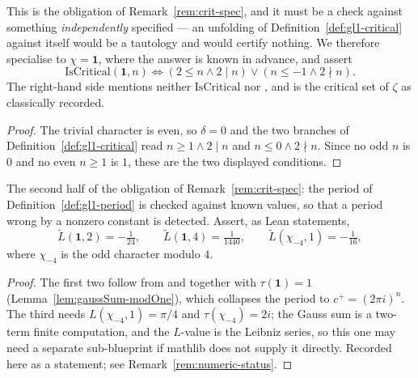 \begin{lemma}
  \label{lem:gl1-crit-spec}
  \leanok
  This is the obligation of Remark~\ref{rem:crit-spec}, and it must be a check against
  something \emph{independently} specified --- an unfolding of
  Definition~\ref{def:gl1-critical} against itself would be a tautology and would
  certify nothing. We therefore specialise to $\chi = \mathbf{1}$, where the answer is
  known in advance, and assert
  \[ \mathrm{IsCritical}(\mathbf{1}, n) \iff (2 \leq n \wedge 2 \mid n) \vee (n \leq -1 \wedge 2 \nmid n). \]
  The right-hand side mentions neither $\mathrm{IsCritical}$ nor
  , and is the critical set of $\zeta$ as classically recorded.
\end{lemma}
\begin{proof}
  \leanok
  The trivial character is even, so $\delta = 0$ and the two branches of
  Definition~\ref{def:gl1-critical} read $n \geq 1 \wedge 2 \mid n$ and
  $n \leq 0 \wedge 2 \nmid n$. Since no odd $n$ is $0$ and no even $n \geq 1$ is $1$,
  these are the two displayed conditions.
\end{proof}

\begin{lemma}
  \label{lem:gl1-numeric}
  The second half of the obligation of Remark~\ref{rem:crit-spec}: the period of
  Definition~\ref{def:gl1-period} is checked against known values, so that a period
  wrong by a nonzero constant is detected. Assert, as Lean statements,
  \[ \widetilde{L}(\mathbf{1},2) = -\tfrac{1}{24}, \qquad
     \widetilde{L}(\mathbf{1},4) = \tfrac{1}{1440}, \qquad
     \widetilde{L}(\chi_{-4},1) = -\tfrac{1}{16}, \]
  where $\chi_{-4}$ is the odd character modulo $4$.
\end{lemma}
\begin{proof}
  The first two follow from  and 
  together with $\tau(\mathbf{1}) = 1$ (Lemma~\ref{lem:gaussSum-modOne}), which
  collapses the period to $c^{+} = (2\pi i)^{n}$. The third needs
  $L(\chi_{-4},1) = \pi/4$ and $\tau(\chi_{-4}) = 2i$; the Gauss sum is a two-term
  finite computation, and the $L$-value is the Leibniz series, so this one may need a
  separate sub-blueprint if mathlib does not supply it directly. Recorded here as a
  statement; see Remark~\ref{rem:numeric-status}.
\end{proof}

